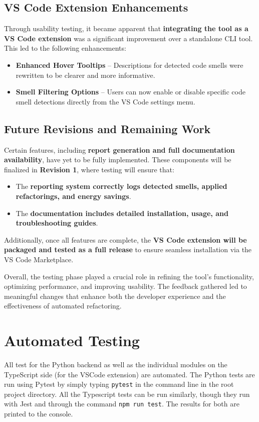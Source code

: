 \documentclass[12pt, titlepage]{article}
\begin{document}
\subsection{VS Code Extension Enhancements}
Through usability testing, it became apparent that
\textbf{integrating the tool as a VS Code extension} was a
significant improvement over a standalone CLI tool. This led to the
following enhancements:
\begin{itemize}
  \item \textbf{Enhanced Hover Tooltips} – Descriptions for detected
    code smells were rewritten to be clearer and more informative.
  \item \textbf{Smell Filtering Options} – Users can now enable or
    disable specific code smell detections directly from the VS Code
    settings menu.
\end{itemize}

\subsection{Future Revisions and Remaining Work}
Certain features, including \textbf{report generation and full
documentation availability}, have yet to be fully implemented. These
components will be finalized in \textbf{Revision 1}, where testing
will ensure that:
\begin{itemize}
  \item The \textbf{reporting system correctly logs detected smells,
    applied refactorings, and energy savings}.
  \item The \textbf{documentation includes detailed installation,
    usage, and troubleshooting guides}.
\end{itemize}

Additionally, once all features are complete, the \textbf{VS Code
extension will be packaged and tested as a full release} to ensure
seamless installation via the VS Code Marketplace.

\bigskip
Overall, the testing phase played a crucial role in refining the
tool's functionality, optimizing performance, and improving
usability. The feedback gathered led to meaningful changes that
enhance both the developer experience and the effectiveness of
automated refactoring.

\section{Automated Testing}

All test for the Python backend as well as the individual modules on
the TypeScript side (for the VSCode extension) are automated. The
Python tests are run using Pytest by simply typing \texttt{pytest} in
the command line in the root project directory. All the Typescript
tests can be run similarly, though they run with Jest and through the
command \texttt{npm run test}. The results for both are printed to the console.
\end{document}
